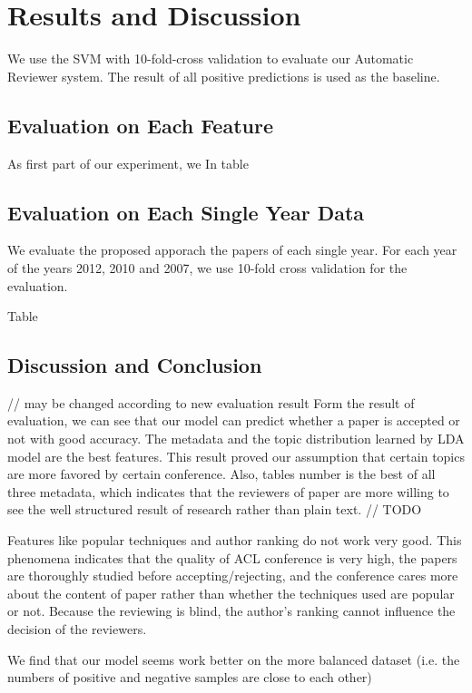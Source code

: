 \documentclass[11pt,letterpaper]{article}
\begin{document}
\section{Results and Discussion}
We use the SVM with 10-fold-cross validation to evaluate our Automatic Reviewer system. The result of all positive predictions is used as the baseline. 


\subsection{Evaluation on Each Feature}
As first part of our experiment, 
we 
In table

\subsection{Evaluation on Each Single Year Data}
We evaluate the proposed apporach the papers of each single year.
For each year of the years 2012, 2010 and 2007, 
we use 10-fold cross validation for the evaluation.

Table

\subsection{Discussion and Conclusion} 

// may be changed according to new evaluation result
Form the result of evaluation, we can see that our model can predict whether a paper is accepted or not with good accuracy. The metadata and the topic distribution learned by LDA model are the best features. This result proved our assumption that certain topics are more favored by certain conference. Also, tables number is the best of all three metadata, which indicates that the reviewers of paper are more willing to see the well structured result of research rather than plain text. // TODO 

Features like popular techniques and author ranking do not work very good. This phenomena indicates that the quality of ACL conference is very high, the papers are thoroughly studied before accepting/rejecting, and the conference cares more about the content of paper rather than whether the techniques used are popular or not. Because the reviewing is blind, the author’s ranking cannot influence the decision of the reviewers. 

We find that our model seems work better on the more balanced dataset (i.e. the numbers of positive and negative samples are close to each other)
\end{document}
